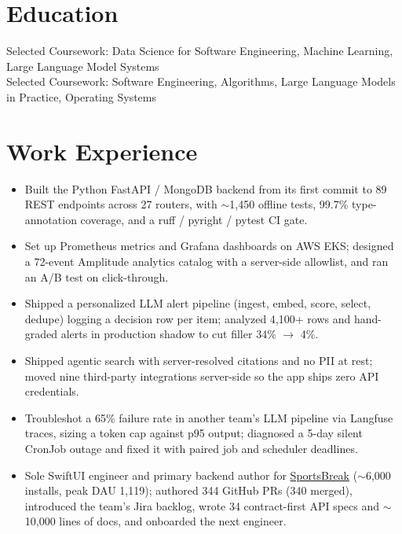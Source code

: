 \documentclass[11pt, letterpaper]{article}
\begin{document}

\section{Education}
Selected Coursework: Data Science for Software Engineering, Machine Learning, Large Language Model Systems\\[1pt]
Selected Coursework: Software Engineering, Algorithms, Large Language Models in Practice, Operating Systems

\section{Work Experience}
\begin{itemize}
  \item Built the Python FastAPI / MongoDB backend from its first commit to 89 REST endpoints across 27 routers, with $\sim$1{,}450 offline tests, 99.7\% type-annotation coverage, and a ruff / pyright / pytest CI gate.
  \item Set up Prometheus metrics and Grafana dashboards on AWS EKS; designed a 72-event Amplitude analytics catalog with a server-side allowlist, and ran an A/B test on click-through.
  \item Shipped a personalized LLM alert pipeline (ingest, embed, score, select, dedupe) logging a decision row per item; analyzed 4{,}100+ rows and hand-graded alerts in production shadow to cut filler 34\% $\to$ 4\%.
  \item Shipped agentic search with server-resolved citations and no PII at rest; moved nine third-party integrations server-side so the app ships zero API credentials.
  \item Troubleshot a 65\% failure rate in another team's LLM pipeline via Langfuse traces, sizing a token cap against p95 output; diagnosed a 5-day silent CronJob outage and fixed it with paired job and scheduler deadlines.
  \item Sole SwiftUI engineer and primary backend author for \href{https://apps.apple.com/app/id6762649287}{SportsBreak} ($\sim$6{,}000 installs, peak DAU 1{,}119); authored 344 GitHub PRs (340 merged), introduced the team's Jira backlog, wrote 34 contract-first API specs and $\sim$10{,}000 lines of docs, and onboarded the next engineer.
\end{itemize}
\end{document}
